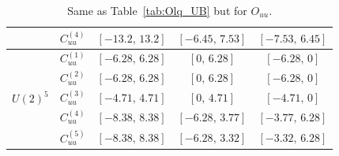 \begin{table}[htbp]
{\begin{tabular}{ccccc}
        & $C_{uu}^{(4)}$ & $[-13.2,\, 13.2]$  & $[-6.45,\, 7.53]$  & $[-7.53,\, 6.45]$ \\
    \midrule
    \multirow{5}{*}{$U(2)^5$}
        & $C_{uu}^{(1)}$ & $[-6.28,\, 6.28]$ & $[0,\, 6.28]$      & $[-6.28,\, 0]$    \\
        & $C_{uu}^{(2)}$ & $[-6.28,\, 6.28]$ & $[0,\, 6.28]$      & $[-6.28,\, 0]$    \\
        & $C_{uu}^{(3)}$ & $[-4.71,\, 4.71]$ & $[0,\, 4.71]$      & $[-4.71,\, 0]$    \\
        & $C_{uu}^{(4)}$ & $[-8.38,\, 8.38]$ & $[-6.28,\, 3.77]$  & $[-3.77,\, 6.28]$ \\
        & $C_{uu}^{(5)}$ & $[-8.38,\, 8.38]$ & $[-6.28,\, 3.32]$  & $[-3.32,\, 6.28]$ \\
    \bottomrule
\end{tabular}}
\caption{Same as Table~\ref{tab:Olq_UB} but for $O_{uu}$.}
\label{tab:Ouu_UB}
\end{table}

